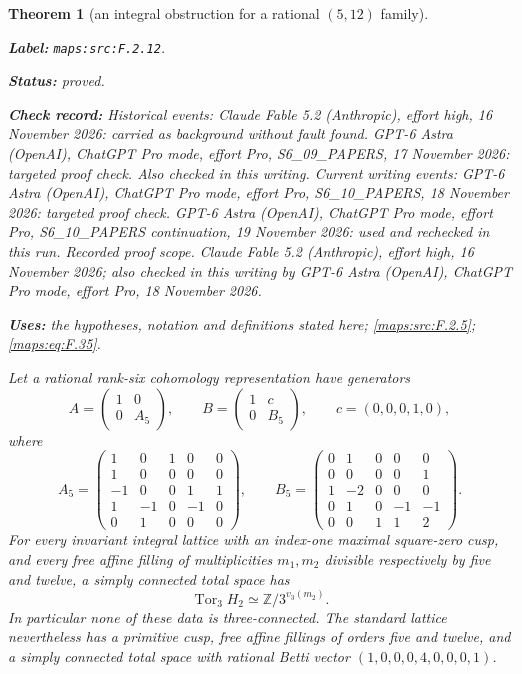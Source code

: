 \documentclass[11pt,a4paper]{article}
\newtheorem{theorem}{Theorem}[section]
\theoremstyle{definition}
\newcommand{\StatementRecord}[4]{\par\smallskip\begingroup\upshape\raggedright\noindent\textbf{Label:} \nolinkurl{#1}.\par\noindent\textbf{Status:} #2.\par\noindent\textbf{Check record:} #3.\par\noindent\textbf{Uses:} #4.\par\endgroup\smallskip}
\begin{document}
\begin{theorem}[an integral obstruction for a rational $(5,12)$ family]\label{maps:src:F.2.12}
\StatementRecord{maps:src:F.2.12}{proved}{Historical events: Claude Fable 5.2 (Anthropic), effort high, 16 November 2026: carried as background without fault found. GPT-6 Astra (OpenAI), ChatGPT Pro mode, effort Pro, S6\_09\_PAPERS, 17 November 2026: targeted proof check. Also checked in this writing. Current writing events: GPT-6 Astra (OpenAI), ChatGPT Pro mode, effort Pro, S6\_10\_PAPERS, 18 November 2026: targeted proof check. GPT-6 Astra (OpenAI), ChatGPT Pro mode, effort Pro, S6\_10\_PAPERS continuation, 19 November 2026: used and rechecked in this run. \emph{Recorded proof scope.} Claude Fable 5.2 (Anthropic), effort high, 16 November 2026; also checked in this writing by GPT-6 Astra (OpenAI), ChatGPT Pro mode, effort Pro, 18 November 2026}{the hypotheses, notation and definitions stated here; \cref{maps:src:F.2.5}; \cref{maps:eq:F.35}}


Let a rational rank-six cohomology representation have generators
\[
 A=\begin{pmatrix}1&0\\0&A_5\end{pmatrix},\qquad
 B=\begin{pmatrix}1&c\\0&B_5\end{pmatrix},\qquad
 c=(0,0,0,1,0),
\]
where
\[
 A_5=\begin{pmatrix}
 1&0&1&0&0\\1&0&0&0&0\\-1&0&0&1&1\\
 1&-1&0&-1&0\\0&1&0&0&0
 \end{pmatrix},\qquad
 B_5=\begin{pmatrix}
 0&1&0&0&0\\0&0&0&0&1\\1&-2&0&0&0\\
 0&1&0&-1&-1\\0&0&1&1&2
 \end{pmatrix}.
 \tag{F.33}\label{maps:eq:F.33}
\]
For every invariant integral lattice with an index-one maximal
square-zero cusp, and every free affine filling of multiplicities
$m_1,m_2$ divisible respectively by five and twelve, a simply
connected total space has
\[
 \operatorname{Tor}_3 H_2
       \simeq\mathbb Z/3^{v_3(m_2)}.
 \tag{F.34}\label{maps:eq:F.34}
\]
In particular none of these data is three-connected.
The standard lattice nevertheless has a primitive cusp,
free affine fillings of orders five and twelve, and a simply
connected total space with rational Betti vector
$(1,0,0,0,4,0,0,0,1)$.

\end{theorem}
\end{document}
